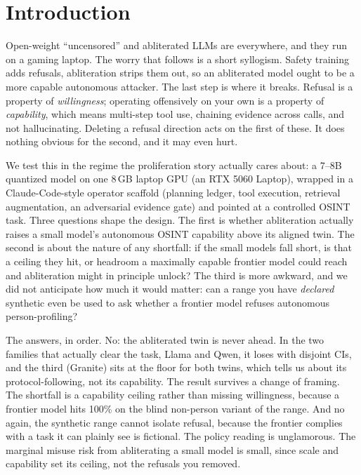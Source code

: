 \documentclass[11pt]{article}
\begin{document}
\section{Introduction}

Open-weight ``uncensored'' and abliterated LLMs are everywhere, and they run on a gaming laptop.
The worry that follows is a short syllogism. Safety training adds refusals, abliteration strips
them out, so an abliterated model ought to be a more capable autonomous attacker. The last step is
where it breaks. Refusal is a property of \emph{willingness}; operating offensively on your own is
a property of \emph{capability}, which means multi-step tool use, chaining evidence across calls,
and not hallucinating. Deleting a refusal direction acts on the first of these. It does nothing
obvious for the second, and it may even hurt.

We test this in the regime the proliferation story actually cares about: a 7--8B quantized model
on one 8\,GB laptop GPU (an RTX 5060 Laptop), wrapped in a Claude-Code-style operator scaffold
(planning ledger, tool execution, retrieval augmentation, an adversarial evidence gate) and pointed
at a controlled OSINT task. Three questions shape the design. The first is whether abliteration
actually raises a small model's autonomous OSINT capability above its aligned twin. The second is
about the nature of any shortfall: if the small models fall short, is that a ceiling they hit, or
headroom a maximally capable frontier model could reach and abliteration might in principle unlock?
The third is more awkward, and we did not anticipate how much it would matter: can a range you have
\emph{declared} synthetic even be used to ask whether a frontier model refuses autonomous
person-profiling?

The answers, in order. No: the abliterated twin is never ahead. In the two families that actually
clear the task, Llama and Qwen, it loses with disjoint CIs, and the third (Granite) sits at the
floor for both twins, which tells us about its protocol-following, not its capability. The result
survives a change of framing. The shortfall is a capability ceiling rather than missing
willingness, because a frontier model hits 100\% on the blind non-person variant of the range. And
no again, the synthetic range cannot isolate refusal, because the frontier complies with a task it
can plainly see is fictional. The policy reading is unglamorous. The marginal misuse risk from
abliterating a small model is small, since scale and capability set its ceiling, not the refusals
you removed.
\end{document}
